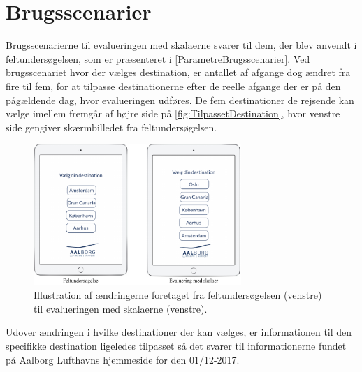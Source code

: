 \section{Brugsscenarier}
\label{TestAfSkalaBrugsscenarier}
%
Brugsscenarierne til evalueringen med skalaerne svarer til dem, der blev anvendt i feltundersøgelsen, som er præsenteret i \autoref{ParametreBrugsscenarier}. Ved brugsscenariet hvor der vælges destination, er antallet af afgange dog ændret fra fire til fem, for at tilpasse destinationerne efter de reelle afgange der er på den pågældende dag, hvor evalueringen udføres. De fem destinationer de rejsende kan vælge imellem fremgår af højre side på \autoref{fig:TilpassetDestination}, hvor venstre side gengiver skærmbilledet fra feltundersøgelsen. 
%
\begin{figure}[H]
\centering
\includegraphics[width =0.7\textwidth]{Figure/TestdesignEvaluering/TilpassetDestination} 
\caption{Illustration af ændringerne foretaget fra feltundersøgelsen (venstre) til evalueringen med skalaerne (venstre).}
\label{fig:TilpassetDestination}
\end{figure}
\noindent
%
Udover ændringen i hvilke destinationer der kan vælges, er informationen til den specifikke destination ligeledes tilpasset så det svarer til informationerne fundet på Aalborg Lufthavns hjemmeside for den 01/12-2017. 